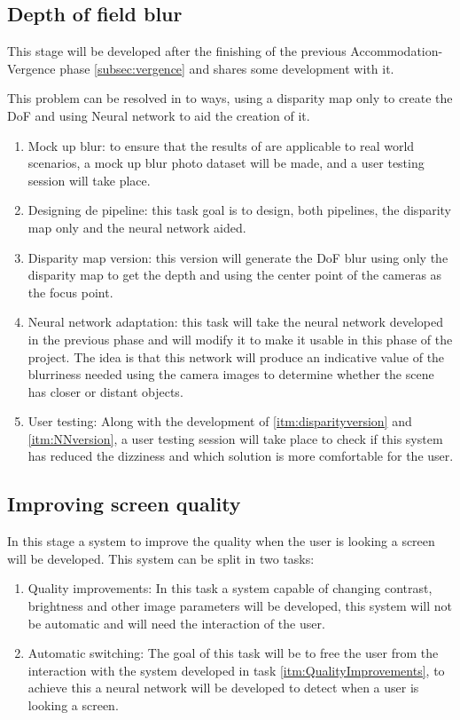 \documentclass[10pt,a4paper,twocolumn,twoside]{article}
\begin{document}
\subsection{Depth of field blur}
This stage will be developed after the finishing of the previous Accommodation-Vergence phase \ref{subsec:vergence} and shares some development with it. 

This problem can be resolved in to ways, using a disparity map only to create the DoF and using Neural network to aid the creation of it.

\begin{enumerate}
	\item Mock up blur: to ensure that the results of \cite{ifftConfortDoF} are applicable to real world scenarios, a mock up blur photo dataset will be made, and a user testing session will take place.
	
	\item Designing de pipeline: this task goal is to design, both pipelines, the disparity map only and the neural network aided.
	
	\item \label{itm:disparityversion} Disparity map version: this version will generate the DoF blur using only the disparity map to get the depth and using the center point of the cameras as the focus point.
	
	\item \label{itm:NNversion} Neural network adaptation: this task will take the neural network developed in the previous phase and will modify it to make it usable in this phase of the project. The idea is that this network will produce an indicative value of the blurriness needed using the camera images to determine whether the scene has closer or distant objects.
	
	\item User testing: Along with the development of \ref{itm:disparityversion} and \ref{itm:NNversion}, a user testing session will take place to check if this system has reduced the dizziness and which solution is more comfortable for the user.
\end{enumerate}

\subsection{Improving screen quality}
In this stage a system to improve the quality when the user is looking a screen will be developed. This system can be split in two tasks:
\begin{enumerate}
	\item \label{itm:QualityImprovements} Quality improvements: In this task a system capable of changing contrast, brightness and other image parameters will be developed, this system will not be automatic and will need the interaction of the user.
	
	\item Automatic switching: The goal of this task will be to free the user from the interaction with the system developed in task \ref{itm:QualityImprovements}, to achieve this a neural network will be developed to detect when a user is looking a screen.
\end{enumerate}
\end{document}
